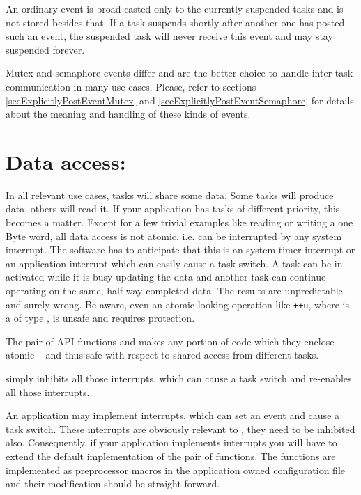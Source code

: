 An ordinary event is broad-casted only to the currently suspended tasks
and is not stored besides that. If a task suspends shortly after another
one has posted such an event, the suspended task will never receive this
event and may stay suspended forever.

Mutex and semaphore events differ and are the better choice to handle
inter-task communication in many use cases. Please, refer to sections
\ref{secExplicitlyPostEventMutex} and
\ref{secExplicitlyPostEventSemaphore} for details about the meaning and
handling of these kinds of events.

\section{Data access: }
\label{secEnterLeaveCritSec}

In all relevant use cases, tasks will share some data. Some tasks will
produce data, others will read it. If your application has tasks of
different priority, this becomes a matter. Except for a few trivial
examples like reading or writing a one Byte word, all data access is not
atomic, i.e. can be interrupted by any system interrupt. The software has
to anticipate that this is an \rtos{} system timer interrupt or an
application interrupt which can easily cause a task switch. A task can be
in-activated while it is busy updating the data and another task can
continue operating on the same, half way completed data. The results are
unpredictable and surely wrong. Be aware, even an atomic looking operation
like \verb$++u$, where  is a of type , is unsafe
and requires protection.

The pair of API functions  and
 makes any portion of code which they
enclose atomic -- and thus safe with respect to shared access from
different tasks.

 simply inhibits all those interrupts,
which can cause a task switch and 
re-enables all those interrupts.

An application may implement interrupts, which can set an \rtos{} event
and cause a task switch. These interrupts are obviously relevant to
, they need to be inhibited also.
Consequently, if your application implements interrupts you will have to
extend the default implementation of the pair of functions. The functions
are implemented as preprocessor macros in the application owned \rtos{}
configuration file  and their modification should be
straight forward.

